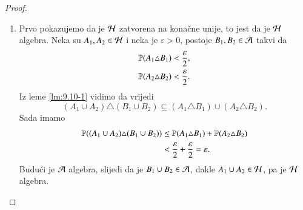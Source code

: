\begin{rj}[\ref{zad:9.10}]
\begin{proof}
\begin{enumerate}[label=(\roman*)]
            \item
            Prvo pokazujemo da je $\mathcal{H}$ zatvorena na kona\v cne unije, to jest da je $\mathcal{H}$ algebra.
            Neka su $A_1, A_2 \in \mathcal{H}$ i neka je $\varepsilon > 0$, postoje $B_1, B_2 \in \mathcal{A}$ takvi da
            \begin{equation*}
                \begin{aligned}
                    \mathbb{P} (A_1 \triangle B_1) &< \frac{\varepsilon}{2},\\
                    \mathbb{P} (A_2 \triangle B_2) &< \frac{\varepsilon}{2}.
                \end{aligned}
            \end{equation*}
            Iz leme \ref{lm:9.10-1} vidimo da vrijedi
            \begin{equation*}
                (A_1 \cup A_2) \triangle (B_1 \cup B_2) \subseteq (A_1 \triangle B_1) \cup (A_2 \triangle B_2). 
            \end{equation*}
            Sada imamo
            \begin{equation*}
                \begin{aligned}
                    \mathbb{P} ((A_1 \cup A_2) \triangle (B_1 \cup B_2)) &\leq \mathbb{P} (A_1 \triangle B_1) + \mathbb{P} (A_2 \triangle B_2)\\
                    &< \frac{\varepsilon}{2} + \frac{\varepsilon}{2} = \varepsilon.
                \end{aligned}
            \end{equation*}
            Budu\' ci je $\mathcal{A}$ algebra, slijedi da je $B_1 \cup B_2 \in \mathcal{A}$, dakle $A_1 \cup A_2 \in \mathcal{H}$, pa je $\mathcal{H}$ algebra.


\end{enumerate}
\end{proof}
\end{rj}
